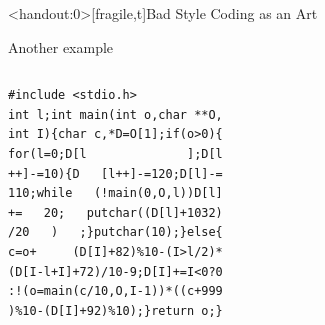 \begin{frame}<handout:0>[fragile,t]{Bad Style Coding as an Art}
  \begin{block}{Another example}
    \medskip
    \begin{columns}
      \begin{column}{.3\linewidth}        
    \begin{Verbatim}[fontsize=\scriptsize]
#include <stdio.h>
int l;int main(int o,char **O,
int I){char c,*D=O[1];if(o>0){
for(l=0;D[l              ];D[l
++]-=10){D   [l++]-=120;D[l]-=
110;while   (!main(0,O,l))D[l]
+=   20;   putchar((D[l]+1032)
/20   )   ;}putchar(10);}else{
c=o+     (D[I]+82)%10-(I>l/2)*
(D[I-l+I]+72)/10-9;D[I]+=I<0?0
:!(o=main(c/10,O,I-1))*((c+999
)%10-(D[I]+92)%10);}return o;}     
    \end{Verbatim}
      \end{column}
      \begin{column}{.32\linewidth}        
      \end{column}
      \begin{column}{.25\linewidth}
      \end{column}
    \end{columns}
  \end{block}

\end{frame}
